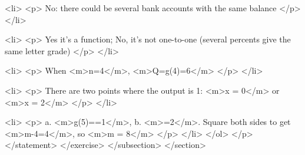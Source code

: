                         <li>
                            <p>
                                No: there could be several bank accounts with the same balance
                            </p>
                        </li>

                        <li>
                            <p>
                                Yes it’s a function; No, it’s not one-to-one (several percents give the same letter grade)
                            </p>
                        </li>

                        <li>
                            <p>
                                When <m>n=4</m>, <m>Q=g(4)=6</m>
                            </p>
                        </li>

                        <li>
                            <p>
                                There are two points where the output is 1: <m>x = 0</m> or <m>x = 2</m>
                            </p>
                        </li>

                        <li>
                            <p>
                                a.
                                <m>g(5)==1</m>, b.
                                <m>=2</m>.
                                Square both sides to get <m>m-4=4</m>, so <m>m = 8</m>
                            </p>
                        </li>
                    </ol>
                </p>
            </statement>
        </exercise>
    </subsection>
</section>